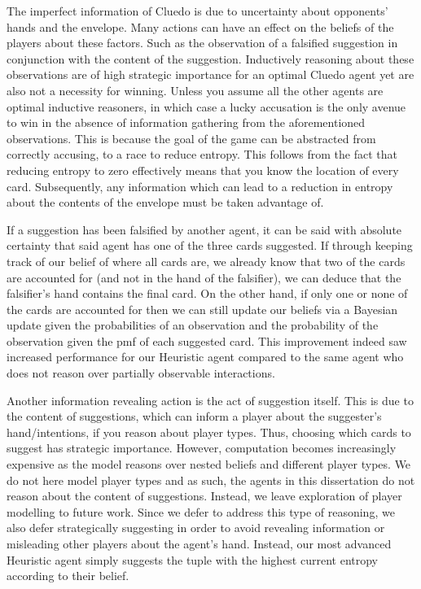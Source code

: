 \documentclass[msc, ai, twoside, notimes, logo, parskip, leftchapter, normalheadings]{infthesis}
\begin{document}
The imperfect information of Cluedo is due to uncertainty about opponents' hands and the envelope. Many actions can have an effect on the beliefs of the players about these factors. Such as the observation of a falsified suggestion in conjunction with the content of the suggestion. Inductively reasoning about these observations are of high strategic importance for an optimal Cluedo agent yet are also not a necessity for winning. Unless you assume all the other agents are optimal inductive reasoners, in which case a lucky accusation is the only avenue to win in the absence of information gathering from the aforementioned observations. This is because the goal of the game can be abstracted from correctly accusing, to a race to reduce entropy. This follows from the fact that reducing entropy to zero effectively means that you know the location of every card. Subsequently, any information which can lead to a reduction in entropy about the contents of the envelope must be taken advantage of. 

If a suggestion has been falsified by another agent, it can be said with absolute certainty that said agent has one of the three cards suggested. If through keeping track of our belief of where all cards are, we already know that two of the cards are accounted for (and not in the hand of the falsifier), we can deduce that the falsifier's hand contains the final card. On the other hand, if only one or none of the cards are accounted for then we can still update our beliefs via a Bayesian update given the probabilities of an observation and the probability of the observation given the pmf of each suggested card. This improvement indeed saw increased performance for our Heuristic agent compared to the same agent who does not reason over partially observable interactions. 

Another information revealing action is the act of suggestion itself. This is due to the content of suggestions, which can inform a player about the suggester's hand/intentions, if you reason about player types. Thus, choosing which cards to suggest has strategic importance. However, computation becomes increasingly expensive as the model reasons over nested beliefs and different player types. We do not here model player types and as such, the agents in this dissertation do not reason about the content of suggestions. Instead, we leave exploration of player modelling to future work. Since we defer to address this type of reasoning, we also defer strategically suggesting in order to avoid revealing information or misleading other players about the agent's hand. Instead, our most advanced Heuristic agent simply suggests the tuple with the highest current entropy according to their belief. 
\end{document}
